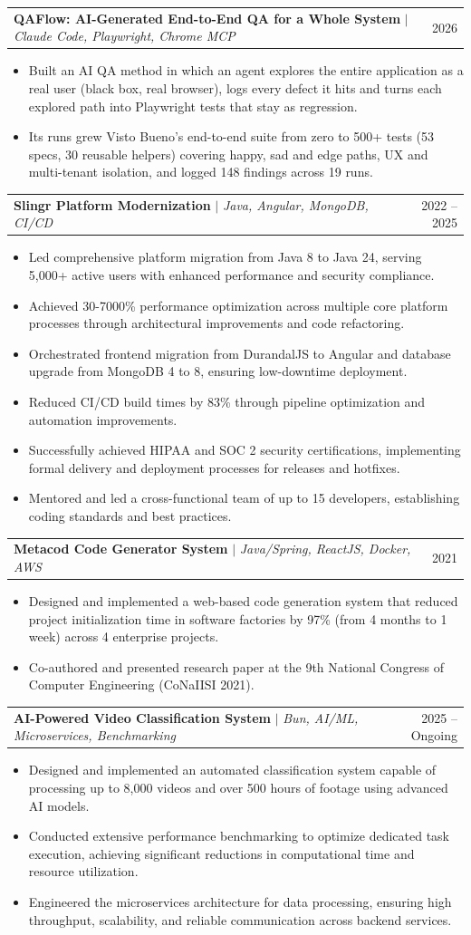 \documentclass[letterpaper,11pt]{article}
\makeatletter
\newcommand{\resumeItem}[1]{
  \item\small{
    {#1 \vspace{-1pt}}
  }
}
\newcommand{\resumeProjectHeading}[2]{
    \item
    \begin{tabular*}{0.97\textwidth}{l@{\extracolsep{\fill}}r}
      \small#1 & #2 \\
    \end{tabular*}\vspace{-5pt}
}
\newcommand{\resumeItemListStart}{\begin{itemize}}
\newcommand{\resumeItemListEnd}{\end{itemize}\vspace{-3pt}}
\makeatother
\begin{document}
  \resumeProjectHeading
    {\textbf{QAFlow: AI-Generated End-to-End QA for a Whole System} $|$ \emph{Claude Code, Playwright, Chrome MCP}}{2026}
    \resumeItemListStart
      \resumeItem{Built an AI QA method in which an agent explores the entire application as a real user (black box, real browser), logs every defect it hits and turns each explored path into Playwright tests that stay as regression.}
      \resumeItem{Its runs grew Visto Bueno's end-to-end suite from zero to 500+ tests (53 specs, 30 reusable helpers) covering happy, sad and edge paths, UX and multi-tenant isolation, and logged 148 findings across 19 runs.}
    \resumeItemListEnd

  \resumeProjectHeading
    {\textbf{Slingr Platform Modernization} $|$ \emph{Java, Angular, MongoDB, CI/CD}}{2022 -- 2025}
    \resumeItemListStart
      \resumeItem{Led comprehensive platform migration from Java 8 to Java 24, serving 5,000+ active users with enhanced performance and security compliance.}
      \resumeItem{Achieved 30-7000\% performance optimization across multiple core platform processes through architectural improvements and code refactoring.}
      \resumeItem{Orchestrated frontend migration from DurandalJS to Angular and database upgrade from MongoDB 4 to 8, ensuring low-downtime deployment.}
      \resumeItem{Reduced CI/CD build times by 83\% through pipeline optimization and automation improvements.}
      \resumeItem{Successfully achieved HIPAA and SOC 2 security certifications, implementing formal delivery and deployment processes for releases and hotfixes.}
      \resumeItem{Mentored and led a cross-functional team of up to 15 developers, establishing coding standards and best practices.}
    \resumeItemListEnd

  \resumeProjectHeading
    {\textbf{Metacod Code Generator System} $|$ \emph{Java/Spring, ReactJS, Docker, AWS}}{2021}
    \resumeItemListStart
      \resumeItem{Designed and implemented a web-based code generation system that reduced project initialization time in software factories by 97\% (from 4 months to 1 week) across 4 enterprise projects.}
      \resumeItem{Co-authored and presented research paper at the 9th National Congress of Computer Engineering (CoNaIISI 2021).}
    \resumeItemListEnd

    \resumeProjectHeading
    {\textbf{AI-Powered Video Classification System} $|$ \emph{Bun, AI/ML, Microservices, Benchmarking}}{2025 -- Ongoing}
    \resumeItemListStart
      \resumeItem{Designed and implemented an automated classification system capable of processing up to 8,000 videos and over 500 hours of footage using advanced AI models.}
      \resumeItem{Conducted extensive performance benchmarking to optimize dedicated task execution, achieving significant reductions in computational time and resource utilization.}
      \resumeItem{Engineered the microservices architecture for data processing, ensuring high throughput, scalability, and reliable communication across backend services.}
    \resumeItemListEnd
\end{document}
